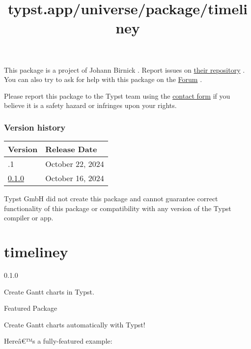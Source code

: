 This package is a project of Johann Birnick . Report issues on
\href{https://github.com/jbirnick/typst-great-theorems}{their
repository} . You can also try to ask for help with this package on the
\href{https://forum.typst.app}{Forum} .

Please report this package to the Typst team using the
\href{https://typst.app/contact}{contact form} if you believe it is a
safety hazard or infringes upon your rights.

\label{versions}
\subsubsection{Version history}\label{version-history}

\begin{longtable}[]{@{}ll@{}}
\toprule\noalign{}
Version & Release Date \\
\midrule\noalign{}
\endhead
\bottomrule\noalign{}
\endlastfoot
0.1.1 & October 22, 2024 \\
\href{https://typst.app/universe/package/great-theorems/0.1.0/}{0.1.0} &
October 16, 2024 \\
\end{longtable}

Typst GmbH did not create this package and cannot guarantee correct
functionality of this package or compatibility with any version of the
Typst compiler or app.


\title{typst.app/universe/package/timeliney}

\label{banner}
\section{timeliney}\label{timeliney}

{ 0.1.0 }

Create Gantt charts in Typst.

{ } Featured Package

\label{readme}
Create Gantt charts automatically with Typst!

Hereâ€™s a fully-featured example:

